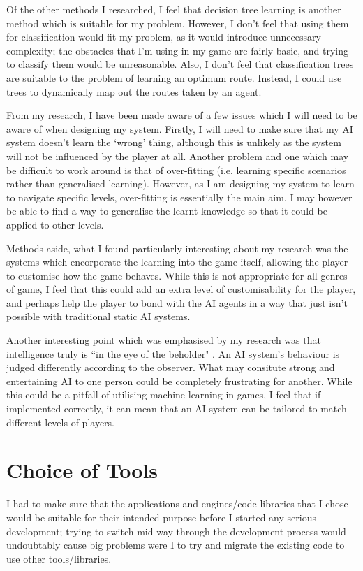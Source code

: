 \documentclass[a4paper,oneside]{report}
\begin{document}
Of the other methods I researched, I feel that decision tree learning is another method which is suitable for my problem. However, I don't feel that using them for classification would fit my problem, as it would introduce unnecessary complexity; the obstacles that I'm using in my game are fairly basic, and trying to classify them would be unreasonable. Also, I don't feel that classification trees are suitable to the problem of learning an optimum route. Instead, I could use trees to dynamically map out the routes taken by an agent.

From my research, I have been made aware of a few issues which I will need to be aware of when designing my system. Firstly, I will need to make sure that my AI system doesn't learn the `wrong' thing, although this is unlikely as the system will not be influenced by the player at all. Another problem and one which may be difficult to work around is that of over-fitting (i.e. learning specific scenarios rather than generalised learning). However, as I am designing my system to learn to navigate specific levels, over-fitting is essentially the main aim. I may however be able to find a way to generalise the learnt knowledge so that it could be applied to other levels. 

Methods aside, what I found particularly interesting about my research was the systems which encorporate the learning into the game itself, allowing the player to customise how the game behaves. While this is not appropriate for all genres of game, I feel that this could add an extra level of customisability for the player, and perhaps help the player to bond with the AI agents in a way that just isn't possible with traditional static AI systems.

Another interesting point which was emphasised by my research was that intelligence truly is ``in the eye of the beholder" \cite{:hc}. An AI system's behaviour is judged differently according to the observer. What may consitute strong and entertaining AI to one person could be completely frustrating for another. While this could be a pitfall of utilising machine learning in games, I feel that if implemented correctly, it can mean that an AI system can be tailored to match different levels of players.
	
\chapter{Choice of Tools}

I had to make sure that the applications and engines/code libraries that I chose would be suitable for their intended purpose before I started any serious development; trying to switch mid-way through the development process would undoubtably cause big problems were I to try and migrate the existing code to use other tools/libraries.
\end{document}
